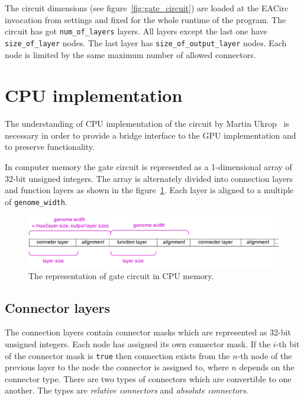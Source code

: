 \documentclass[12pt,twoside]{fithesis2}
\begin{document}
The circuit dimensions (see figure~\ref{fig:gate_circuit}) are loaded at the EACirc invocation from settings and fixed for the whole runtime of the program. The circuit has got \texttt{num\_of\_layers} layers. All layers except the last one have \texttt{size\_of\_layer} nodes. The last layer has \texttt{size\_of\_output\_layer} nodes. Each node is limited by the same maximum number of allowed connectors.


\section{CPU implementation}
\label{cpu_implementation}

The understanding of CPU implementation of the circuit by Martin Ukrop~\cite{ukrop_thesis} is necessary in order to provide a bridge interface to the GPU implementation and to preserve functionality.

In computer memory the gate circuit is represented as a 1-dimensional array of 32-bit unsigned integers. The array is alternately divided into connection layers and function layers as shown in the figure~\ref{fig:circuit_cpu_array}. Each layer is aligned to a multiple of \texttt{genome\_width}.

\begin{figure}[h]
	\centering
	\includegraphics[width=\textwidth]{figures/cpu_genome.pdf}
	\caption{The representation of gate circuit in CPU memory.}
	\label{fig:circuit_cpu_array}
\end{figure}

\subsection{Connector layers}

The connection layers contain connector masks which are represented as 32-bit unsigned integers. Each node has assigned its own connector mask. If the $i$-th bit of the connector mask is \texttt{true} then connection exists from the $n$-th node of the previous layer to the node the connector is assigned to, where $n$ depends on the connector type. There are two types of connectors which are convertible to one another. The types are \emph{relative connectors} and \emph{absolute connectors}.
\end{document}
